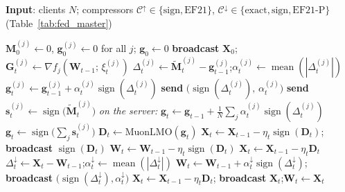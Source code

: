 \begin{algorithm}[H]
\algnarrow
    \caption{Federated MuonUSign / MuonSign / EF21-MuonUSign / EF21-MuonSign (server-side LMO)}
    \label{alg:fed_serverlmo}
    \textbf{Input}: clients $N$; compressors $\mathcal{C}^{\uparrow}\in\{\text{sign},\text{EF21}\}$, $\mathcal{C}^{\downarrow}\in\{\text{exact},\text{sign},\text{EF21-P}\}$ (Table~\ref{tab:fed_master})
    \begin{algorithmic}[1]
    \State $\mathbf{M}_0^{(j)} \gets 0$, $\mathbf{g}_0^{(j)} \gets 0$ for all $j$; \quad $\mathbf{g}_0 \gets 0$
    \State \textbf{broadcast} $\mathbf{X}_0$; 
            \State $\mathbf{G}_t^{(j)} \gets \nabla f_j(\mathbf{W}_{t-1};\,\xi_{t}^{(j)})$
            \State {}
                \State $\Delta_t^{(j)} \gets \tilde{\mathbf{M}}_t^{(j)} - \mathbf{g}_{t-1}^{(j)}$;\quad $\alpha_t^{(j)} \gets \operatorname{mean}(|\Delta_t^{(j)}|)$
                \State $\mathbf{g}_{t}^{(j)} \gets \mathbf{g}_{t-1}^{(j)} + \alpha_t^{(j)}\operatorname{sign}(\Delta_t^{(j)})$
                \State \textbf{send} $\bigl(\operatorname{sign}(\Delta_t^{(j)}),\, \alpha_t^{(j)}\bigr)$
            \Else
                \State \textbf{send} $\mathbf{s}_t^{(j)} \gets \operatorname{sign}\bigl(\tilde{\mathbf{M}}_t^{(j)}\bigr)$
            \EndIf
        \EndFor
        \Statex \quad\emph{on the server:}
            \State $\mathbf{g}_t \gets \mathbf{g}_{t-1} + \tfrac{1}{N}\sum_{j} \alpha_t^{(j)}\operatorname{sign}(\Delta_t^{(j)})$
        \Else
            \State $\mathbf{g}_t \gets \operatorname{sign}\bigl(\sum_{j} \mathbf{s}_t^{(j)}\bigr)$
        \EndIf
        \State $\mathbf{D}_t \gets \mathrm{MuonLMO}(\mathbf{g}_t)$
            \State $\mathbf{X}_{t} \gets \mathbf{X}_{t-1} - \eta_t \operatorname{sign}(\mathbf{D}_t)$;\; \textbf{broadcast} $\operatorname{sign}(\mathbf{D}_t)$
            \State $\mathbf{W}_{t} \gets \mathbf{W}_{t-1} - \eta_t\operatorname{sign}(\mathbf{D}_t)$
            \State $\mathbf{X}_{t} \gets \mathbf{X}_{t-1} - \eta_t \mathbf{D}_t$
            \State $\Delta_t^{\downarrow} \gets \mathbf{X}_{t} - \mathbf{W}_{t-1}$;\quad $\alpha_t^{\downarrow} \gets \operatorname{mean}(|\Delta_t^{\downarrow}|)$
            \State $\mathbf{W}_{t} \gets \mathbf{W}_{t-1} + \alpha_t^{\downarrow}\operatorname{sign}(\Delta_t^{\downarrow})$;\; \textbf{broadcast} $\bigl(\operatorname{sign}(\Delta_t^{\downarrow}),\alpha_t^{\downarrow}\bigr)$
        \Else
            \State $\mathbf{X}_{t} \gets \mathbf{X}_{t-1} - \eta_t \mathbf{D}_t$;\; \textbf{broadcast} $\mathbf{X}_t$;\quad $\mathbf{W}_{t} \gets \mathbf{X}_t$
        \EndIf
    \EndFor
    \end{algorithmic}
\end{algorithm}

